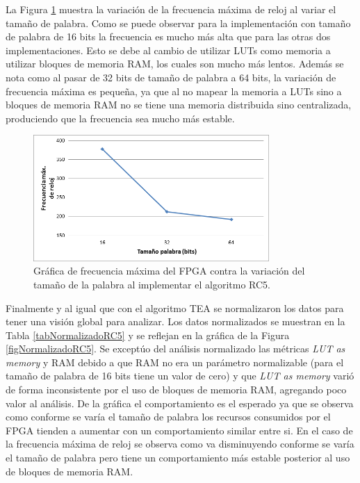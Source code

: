 La Figura \ref{figFrecuenciasRC5} muestra la variación de la frecuencia máxima de reloj al variar el tamaño de palabra. Como se puede observar para la implementación con tamaño de palabra de 16 bits la frecuencia es mucho más alta que para las otras dos implementaciones. Esto se debe al cambio de utilizar LUTs como memoria a utilizar bloques de memoria RAM, los cuales son mucho más lentos. Además se nota como al pasar de 32 bits de tamaño de palabra a 64 bits, la variación de frecuencia máxima es pequeña, ya que al no mapear la memoria a LUTs sino a bloques de memoria RAM no se tiene una memoria distribuida sino centralizada, produciendo que la frecuencia sea mucho más estable.
\begin{figure}[H]
	\centering
	\includegraphics[width=0.8\textwidth]{./images/figFrecuenciasRC5}
	\caption{Gráfica de frecuencia máxima del FPGA contra la variación del tamaño de la palabra al implementar el algoritmo RC5.}
	\label{figFrecuenciasRC5}
\end{figure}

Finalmente y al igual que con el algoritmo TEA se normalizaron los datos para tener una visión global para analizar. Los datos normalizados se muestran en la Tabla \ref{tabNormalizadoRC5} y se reflejan en la gráfica de la Figura \ref{figNormalizadoRC5}. Se exceptúo del análisis normalizado las métricas \textit{LUT as memory} y RAM debido a que RAM no era un parámetro normalizable (para el tamaño de palabra de 16 bits tiene un valor de cero) y que \textit{LUT as memory} varió de forma inconsistente por el uso de bloques de memoria RAM, agregando poco valor al análisis. De la gráfica el comportamiento es el esperado ya que se observa como conforme se varía el tamaño de palabra los recursos consumidos por el FPGA tienden a aumentar con un comportamiento similar entre si. En el caso de la frecuencia máxima de reloj se observa como va disminuyendo conforme se varía el tamaño de palabra pero tiene un comportamiento más estable posterior al uso de bloques de memoria RAM. 

